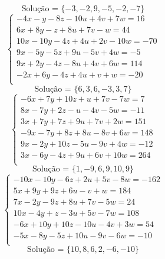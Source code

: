 \documentclass[12pt,oneside,a4paper]{article}
\begin{document}
\begin{equation*}
\text{Solução = }\{-3,-2,9,-5,-2,-7\}
\end{equation*}
\vspace{\baselineskip}
\begin{equation*}
\begin{cases}
-4x-y-8z-10u+4v+7w=16 \\
6x+8y-z+8u+7v-w=44 \\
10x-10y-4z+4u+2v-10w=-70 \\
9x-5y-5z+9u-5v+4w=-5 \\
9x+2y-4z-8u+4v+6w=114 \\
-2x+6y-4z+4u+v+w=-20 \\
\end{cases}
\end{equation*}
\begin{equation*}
\text{Solução = }\{6,3,6,-3,3,7\}
\end{equation*}
\vspace{\baselineskip}
\begin{equation*}
\begin{cases}
-6x+7y+10z+u+7v-7w=7 \\
8x-7y+2z-u-4v-5w=-11 \\
3x+7y+7z+9u+7v+2w=151 \\
-9x-7y+8z+8u-8v+6w=148 \\
9x-2y+10z-5u-9v+4w=-12 \\
3x-6y-4z+9u+6v+10w=264 \\
\end{cases}
\end{equation*}
\begin{equation*}
\text{Solução = }\{1,-9,6,9,10,9\}
\end{equation*}
\vspace{\baselineskip}
\begin{equation*}
\begin{cases}
-10x-10y-6z+2u+5v-8w=-162 \\
5x+9y+9z+6u-v+w=184 \\
7x-2y-9z+8u+7v-5w=24 \\
10x-4y+z-3u+5v-7w=108 \\
-6x+10y+10z-10u-4v+3w=54 \\
-5x-8y-5z+10u-9v-6w=-10 \\
\end{cases}
\end{equation*}
\begin{equation*}
\text{Solução = }\{10,8,6,2,-6,-10\}
\end{equation*}
\end{document}
